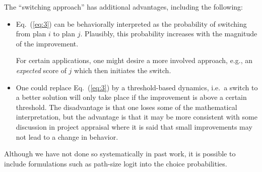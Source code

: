 The ``switching approach'' has additional advantages, including the
following:
\begin{itemize}

\item Eq.~(\ref{eq:3}) can be behaviorally interpreted as the
  probability of switching from plan $i$ to plan $j$.  Plausibly, this
  probability increases with the magnitude of the improvement.  

  For certain applications, one might desire a more involved approach,
  e.g., an \emph{expected} score of $j$ which then initiates the
  switch.

\item One could replace Eq.~(\ref{eq:3}) by a threshold-based
  dynamics, i.e.\ a switch to a better solution will only take place
  if the improvement is above a certain threshold.  The disadvantage
  is that one loses some of the mathematical interpretation, but the
  advantage is that it may be more consistent with some discussion in
  project appraisal where it is said that small improvements may not
  lead to a change in behavior.


\end{itemize}

Although we have not done so systematically in past work, it is 
possible to include formulations such as path-size logit 
\citep{ben-akiva-1999} into the choice probabilities.



